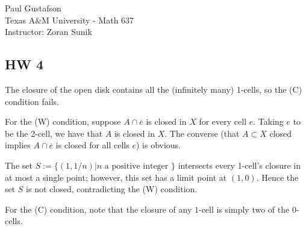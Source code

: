 \documentclass{article}
\begin{document}
\noindent Paul Gustafson\\   
\noindent Texas A\&M University - Math 637\\ 
\noindent Instructor: Zoran Sunik

\subsection*{HW 4}
 The closure of the open disk contains all the (infinitely many) 1-cells, so the (C) condition fails. 

For the (W) condition, suppose $A \cap \overline{e}$ is closed in $X$ for every cell $e$. Taking $e$ to be the 2-cell, we have that $A$ is closed in $X$.
The converse (that $A \subset X$ closed implies $A \cap \overline{e}$ is closed for all cells $e$) is obvious.

 The set $S := \{(1,1/n) \vert n \text{ a positive integer } \}$ intersects every 1-cell's closure in at most a single point; however, this set has a limit point at $(1,0)$.  Hence the set $S$ is not closed, contradicting the (W) condition.

For the (C) condition, note that the closure of any $1$-cell is simply two of the $0$-cells.

\end{document}
